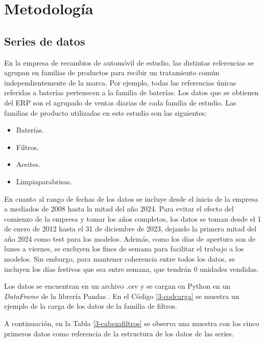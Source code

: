 \chapter{Metodología}\label{cap3}

\section{Series de datos}

En la empresa de recambios de automóvil de estudio, las distintas referencias se agrupan en familias de productos para recibir un tratamiento común independientemente de la marca. Por ejemplo, todas las referencias únicas referidas a baterías pertenecen a la familia de baterías. Los datos que se obtienen del ERP son el agrupado de ventas diarias de cada familia de estudio. Las familias de producto utilizadas en este estudio son las siguientes:

\begin{itemize}
    \item Baterías.
    \item Filtros.
    \item Aceites.
    \item Limpiaparabrisas.
\end{itemize} 

En cuanto al rango de fechas de los datos se incluye desde el inicio de la empresa a mediados de 2008 hasta la mitad del año 2024. Para evitar el efecto del comienzo de la empresa y tomar los años completos, los datos se toman desde el 1 de enero de 2012 hasta el 31 de diciembre de 2023, dejando la primera mitad del año 2024 como test para los modelos. Además, como los días de apertura son de lunes a viernes, se excluyen los fines de semana para facilitar el trabajo a los modelos. Sin embargo, para mantener coherencia entre todos los datos, se incluyen los días festivos que sea entre semana, que tendrán 0 unidades vendidas.

Los datos se encuentran en un archivo .csv y se cargan en Python en un \textit{DataFrame} de la librería Pandas \cite{pandas}. En el Código \ref*{3-codcarga} se muestra un ejemplo de la carga de los datos de la familia de filtros. 



A continuación, en la Tabla \ref*{3-cabezafiltros} se observa una muestra con los cinco primeros datos como referencia de la estructura de los datos de las series.

